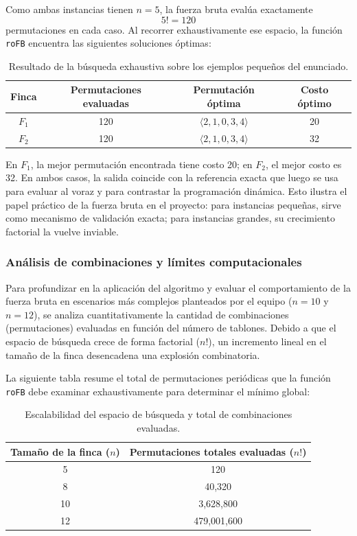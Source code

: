 \documentclass[12pt,a4paper]{article}
\begin{document}
Como ambas instancias tienen \(n=5\), la fuerza bruta eval\'ua exactamente
\[
5! = 120
\]
permutaciones en cada caso. Al recorrer exhaustivamente ese espacio, la funci\'on \texttt{roFB} encuentra las siguientes soluciones \'optimas:

\begin{table}[H]
  \centering
  \small
  \begin{tabular}{cccc}
    \toprule
    Finca & Permutaciones evaluadas & Permutaci\'on \'optima & Costo \'optimo \\
    \midrule
    \(F_1\) & 120 & \(\langle 2,1,0,3,4\rangle\) & 20 \\
    \(F_2\) & 120 & \(\langle 2,1,0,3,4\rangle\) & 32 \\
    \bottomrule
  \end{tabular}
  \caption{Resultado de la b\'usqueda exhaustiva sobre los ejemplos peque\~nos del enunciado.}
\end{table}

En \(F_1\), la mejor permutaci\'on encontrada tiene costo 20; en \(F_2\), el mejor costo es 32. En ambos casos, la salida coincide con la referencia exacta que luego se usa para evaluar al voraz y para contrastar la programaci\'on din\'amica. Esto ilustra el papel pr\'actico de la fuerza bruta en el proyecto: para instancias peque\~nas, sirve como mecanismo de validaci\'on exacta; para instancias grandes, su crecimiento factorial la vuelve inviable.

\subsubsection{An\'alisis de combinaciones y l\'imites computacionales}

Para profundizar en la aplicaci\'on del algoritmo y evaluar el comportamiento de la fuerza bruta en escenarios m\'as complejos planteados por el equipo ($n=10$ y $n=12$), se analiza cuantitativamente la cantidad de combinaciones (permutaciones) evaluadas en funci\'on del n\'umero de tablones. Debido a que el espacio de b\'usqueda crece de forma factorial ($n!$), un incremento lineal en el tama\~no de la finca desencadena una explosi\'on combinatoria.

La siguiente tabla resume el total de permutaciones peri\'odicas que la funci\'on \texttt{roFB} debe examinar exhaustivamente para determinar el m\'inimo global:

\begin{table}[H]
  \centering
  \small
  \begin{tabular}{cc}
    \toprule
    Tama\~no de la finca (\(n\)) & Permutaciones totales evaluadas (\(n!\)) \\
    \midrule
    5  & 120 \\
    8  & 40,320 \\
    10 & 3,628,800 \\
    12 & 479,001,600 \\
    \bottomrule
  \end{tabular}
  \caption{Escalabilidad del espacio de b\'usqueda y total de combinaciones evaluadas.}
\end{table}
\end{document}
